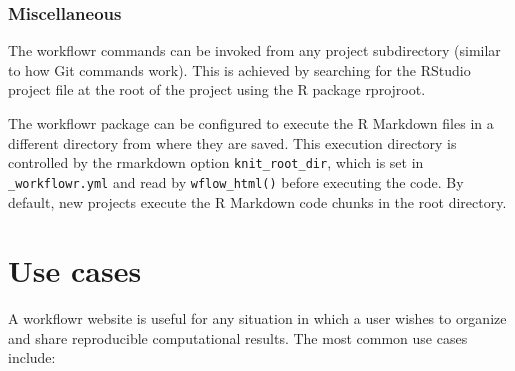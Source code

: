 \documentclass[9pt,a4paper]{extarticle}
\begin{document}
\subsubsection*{Miscellaneous}

The workflowr commands can be invoked from any project subdirectory
(similar to how Git commands work). This is achieved by searching for
the RStudio project file at the root of the project using the R package
rprojroot.

The workflowr package can be configured to execute the R Markdown files
in a different directory from where they are saved. This execution
directory is controlled by the rmarkdown option \verb|knit_root_dir|,
which is set in \verb| _workflowr.yml| and read by \verb|wflow_html()| before
executing the code. By default, new projects execute the R Markdown code
chunks in the root directory.


\section*{Use cases}

A workflowr website is useful for any situation in which a user wishes
to organize and share reproducible computational results. The most
common use cases include:
\end{document}
